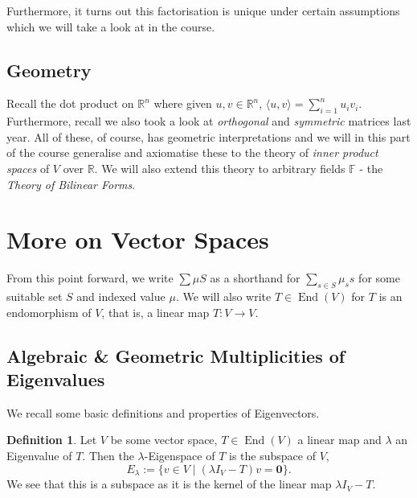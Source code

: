 \documentclass[
]{article}
\theoremstyle{definition}
\newtheorem{definition}{Definition}[section]
\begin{document}
Furthermore, it turns out this factorisation is unique under certain
assumptions which we will take a look at in the course.

\hypertarget{geometry}{%
\subsection{Geometry}\label{geometry}}

Recall the dot product on \(\mathbb{R}^n\) where given
\(u, v \in \mathbb{R}^n\),
\(\langle u, v \rangle = \sum_{i = 1}^n u_i v_i\). Furthermore, recall
we also took a look at \emph{orthogonal} and \emph{symmetric} matrices
last year. All of these, of course, has geometric interpretations and we
will in this part of the course generalise and axiomatise these to the
theory of \emph{inner product spaces} of \(V\) over \(\mathbb{R}\). We
will also extend this theory to arbitrary fields \(\mathbb{F}\) - the
\emph{Theory of Bilinear Forms}.

\newpage

\hypertarget{more-on-vector-spaces}{%
\section{More on Vector Spaces}\label{more-on-vector-spaces}}

From this point forward, we write \(\sum \mu S\) as a shorthand for
\(\sum_{s \in S} \mu_s s\) for some suitable set \(S\) and indexed value
\(\mu\). We will also write \(T \in \mathop{\mathrm{End}}(V)\) for \(T\)
is an endomorphism of \(V\), that is, a linear map \(T : V \to V\).

\hypertarget{algebraic-geometric-multiplicities-of-eigenvalues}{%
\subsection{Algebraic \& Geometric Multiplicities of
Eigenvalues}\label{algebraic-geometric-multiplicities-of-eigenvalues}}

We recall some basic definitions and properties of Eigenvectors.

\begin{definition}
  Let \(V\) be some vector space, \(T \in \mathop{\mathrm{End}}(V)\) a linear map and \(\lambda\) 
  an Eigenvalue of \(T\). Then the \(\lambda\)-Eigenspace of \(T\) is the 
  subspace of \(V\),
  \[E_\lambda := \{ v \in V \mid (\lambda I_V - T)v = \mathbf{0} \}.\]
  We see that this is a subspace as it is the kernel of the linear map 
  \(\lambda I_V - T\).
\end{definition}
\end{document}
